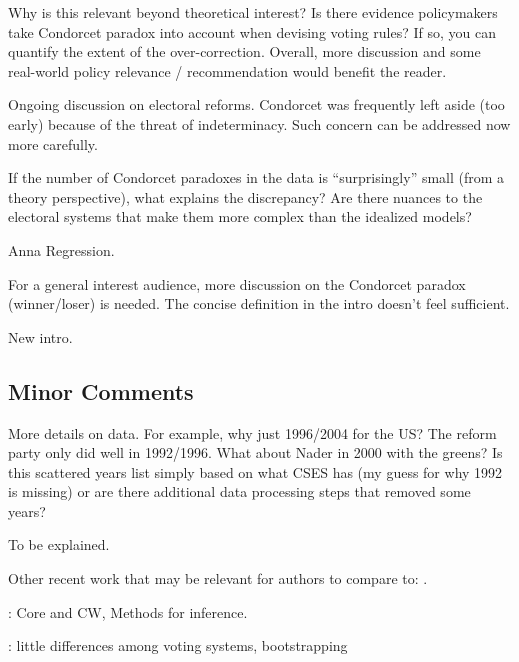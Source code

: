 \documentclass[a4paper, 12pt]{scrartcl}
\theoremstyle{break}
\newenvironment{changes}{\par\color{violet}\par\addvspace{\baselineskip}}{\par\addvspace{\baselineskip}}
\begin{document}
\begin{changes}
	Why is this relevant beyond theoretical interest? Is there evidence policymakers take Condorcet paradox into account when devising voting rules? If so, you can quantify the extent of the over-correction. Overall, more discussion and some real-world policy relevance / recommendation would benefit the reader.
\end{changes}

Ongoing discussion on electoral reforms. Condorcet was frequently left aside (too early) because of the threat of indeterminacy. Such concern can be addressed now more carefully.

\begin{changes}
	If the number of Condorcet paradoxes in the data is ``surprisingly'' small (from a theory perspective), what explains the discrepancy? Are there nuances to the electoral systems that make them more complex than the idealized models?
\end{changes}

Anna Regression.

\begin{changes}
	For a general interest audience, more discussion on the Condorcet paradox (winner/loser) is needed. The concise definition in the intro doesn’t feel sufficient.
\end{changes}

New intro.

\subsection{Minor Comments}
\begin{changes}
	More details on data. For example, why just 1996/2004 for the US? The reform party only did well in 1992/1996. What about Nader in 2000 with the greens? Is this scattered years list simply based on what CSES has (my guess for why 1992 is missing) or are there additional data processing steps that removed some years?
\end{changes}

To be explained.

\begin{changes}
	Other recent work that may be relevant for authors to compare to: \cite{Desai2025, Darmann2019}.
\end{changes}

\citeauthor{Desai2025}: Core and CW, Methods for inference.

\citeauthor{Darmann2019}: little differences among voting systems, bootstrapping
\end{document}
